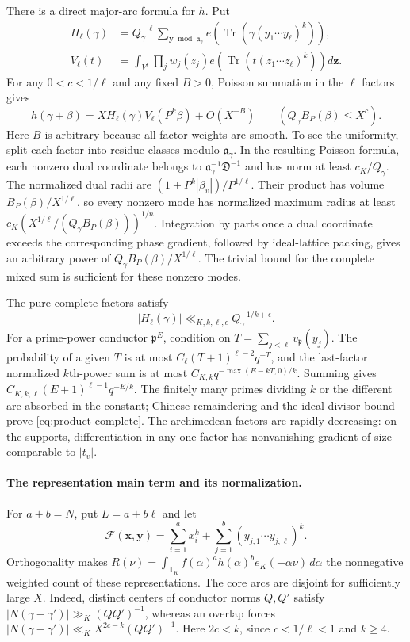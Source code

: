 \documentclass[11pt]{amsart}
\theoremstyle{definition}
\numberwithin{equation}{section}
\begin{document}
There is a direct major-arc formula for $h$.  Put
\begin{align*}
 H_\ell(\gamma)&=Q_\gamma^{-\ell}
 \sum_{\mathbf y\bmod\mathfrak a_\gamma}
 e\!\left(\operatorname {Tr}(\gamma(y_1\cdots y_\ell)^k)\right),\\
 V_\ell(t)&=\int_{V^\ell}\prod_j w_j(z_j)
 e\!\left(\operatorname {Tr}(t(z_1\cdots z_\ell)^k)\right)d\mathbf z.
\end{align*}
For any $0<c<1/\ell$ and any fixed $B>0$, Poisson summation in the $\ell$ factors gives
\begin{equation}\label{eq:product-core}
 h(\gamma+\beta)=XH_\ell(\gamma)V_\ell(P^k\beta)+O(X^{-B})
 \qquad(Q_\gamma B_P(\beta)\le X^c).
\end{equation}
Here $B$ is arbitrary because all factor weights are smooth.  To see the uniformity,
split each factor into residue classes modulo $\mathfrak a_\gamma$.
In the resulting Poisson formula, each nonzero dual coordinate belongs to
$\mathfrak a_\gamma^{-1}\mathfrak D^{-1}$ and has norm at least $c_K/Q_\gamma$.
The normalized dual radii are $(1+P^k|\beta_v|)/P^{1/\ell}$.
Their product has volume $B_P(\beta)/X^{1/\ell}$, so every nonzero mode has
normalized maximum radius at least
$c_K(X^{1/\ell}/(Q_\gamma B_P(\beta)))^{1/n}$.
Integration by parts once a dual coordinate exceeds the corresponding phase
gradient, followed by ideal-lattice packing, gives an arbitrary power of
$Q_\gamma B_P(\beta)/X^{1/\ell}$.
The trivial bound for the complete mixed sum is sufficient for these nonzero modes.

The pure complete factors satisfy
\begin{equation}\label{eq:product-complete}
 |H_\ell(\gamma)|\ll_{K,k,\ell,\epsilon}Q_\gamma^{-1/k+\epsilon}.
\end{equation}
For a prime-power conductor $\mathfrak p^E$, condition on
$T=\sum_{j<\ell}v_\mathfrak p(y_j)$.
The probability of a given $T$ is at most
$C_\ell(T+1)^{\ell-2}q^{-T}$, and the last-factor normalized $k$th-power sum
is at most $C_{K,k}q^{-\max(E-kT,0)/k}$.
Summing gives $C_{K,k,\ell}(E+1)^{\ell-1}q^{-E/k}$.
The finitely many primes dividing $k$ or the different are absorbed in the constant;
Chinese remaindering and the ideal divisor bound prove \eqref{eq:product-complete}.
The archimedean factors are rapidly decreasing: on the supports, differentiation
in any one factor has nonvanishing gradient of size comparable to $|t_v|$.

\paragraph{The representation main term and its normalization.}
For $a+b=N$, put $L=a+b\ell$ and let
\[
 \mathcal F(\mathbf x,\mathbf y)
   =\sum_{i=1}^a x_i^k+
      \sum_{j=1}^b(y_{j,1}\cdots y_{j,\ell})^k.
\]
Orthogonality makes
$R(\nu)=\int_{\mathbb T_K}f(\alpha)^ah(\alpha)^b e_K(-\alpha\nu)\,d\alpha$
the nonnegative weighted count of these representations.
The core arcs are disjoint for sufficiently large $X$.
Indeed, distinct centers of conductor norms $Q,Q'$ satisfy
$|N(\gamma-\gamma')|\gg_K(QQ')^{-1}$, whereas an overlap forces
$|N(\gamma-\gamma')|\ll_K X^{2c-k}(QQ')^{-1}$.
Here $2c<k$, since $c<1/\ell<1$ and $k\ge4$.
\end{document}
